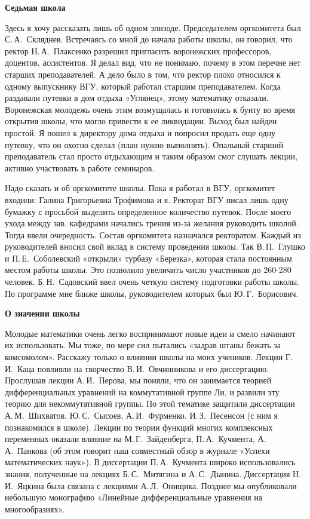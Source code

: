 {\bf Седьмая школа}

Здесь я хочу рассказать лишь об одном эпизоде.
Председателем оргкомитета был С.\,А.~Скляднев.
Встречаясь со мной до начала работы школы, он говорил,
что ректор
\linebreak
Н.\,А.~Плаксенко разрешил пригласить воронежских профессоров, доцентов, ассистентов.
Я делал вид, что не понимаю, почему в этом перечне нет старших преподавателей. А дело было в том, что ректор плохо относился к одному выпускнику ВГУ, который работал старшим преподавателем. Когда раздавали путевки в дом отдыха «Углянец», этому математику отказали. Воронежская молодежь очень этим возмущалась и готовилась к бунту во время открытия школы, что могло привести к ее ликвидации. Выход был найден простой. Я пошел к директору дома отдыха и попросил продать еще одну путевку, что он охотно сделал (план нужно выполнять). Опальный старший преподаватель стал просто отдыхающим и таким образом смог слушать лекции, активно участвовать в работе семинаров.

Надо сказать и об оргкомитете школы. Пока я работал в ВГУ, оргкомитет входили: Галина Григорьевна Трофимова и я. Ректорат ВГУ писал лишь одну бумажку с просьбой выделить определенное количество путевок. После моего ухода между зав. кафедрами начались трения из-за желания руководить школой. Тогда ввели очередность. Состав оргкомитета назначался ректоратом. Каждый из руководителей вносил свой вклад в систему проведения школы. Так В.\,П.~Глушко и П.\,Е.~Соболевский «открыли» турбазу «Березка», которая стала постоянным местом работы школы. Это позволило увеличить число участников до 260-280 человек. Б.\,Н.~Садовский ввел очень четкую систему подготовки работы школы. По программе мне ближе школы, руководителем которых был Ю.\,Г.~Борисович.

{\bf О значении школы}

Молодые математики очень легко воспринимают новые идеи и смело начинают их использовать.
Мы тоже, по мере сил пытались «задрав штаны бежать за комсомолом». Расскажу только о влиянии школы на моих учеников.
Лекции Г.\,И.~Каца повлияли на творчество В.\,И.~Овчинникова и его диссертацию.
Прослушав лекции А.\,И.~Перова, мы поняли, что он занимается теорией дифференциальных уравнений на коммутативной группе Ли,
и развили эту теорию для некоммутативной группы.
По этой тематике защитили диссертации А.\,М.~Шихватов. Ю.\,С.~Сысоев, А.\,И.~Фурменко. И.\,З.~Песенсон (с ним я познакомился в школе).
Лекции по теории функций многих комплексных переменных оказали влияние на М.\,Г.~Зайденберга, П.\,А.~Кучмента, А.\,А.~Панкова
(об этом говорит наш совместный обзор в журнале «Успехи математических наук»).
В диссертации П.\,А.~Кучмента широко использовались знания, полученные на лекциях Б.\,С.~Ми\-тя\-ги\-на и А.\,С.~Дынина. Диссертация Н.\,И.~Яцкина была связана с лекциями А.\,Л.~Онищика. Позднее мы опубликовали небольшую монографию «Линейные дифференциальные уравнения на многообразиях».

